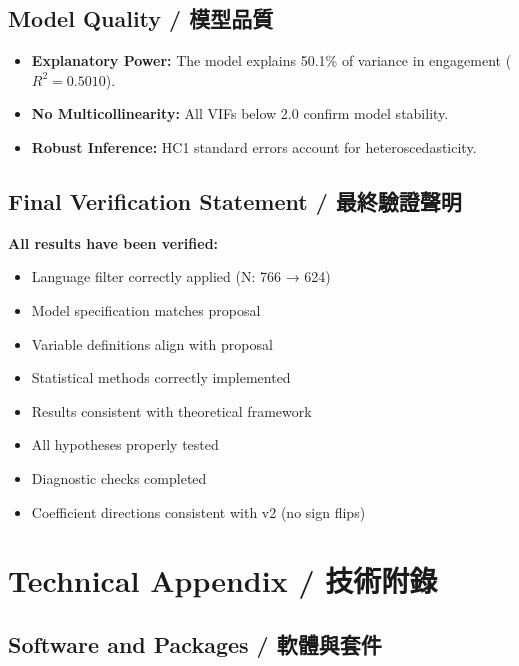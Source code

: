 \documentclass[12pt,a4paper]{article}
\begin{document}
\subsection{Model Quality / 模型品質}

\begin{itemize}
    \item \textbf{Explanatory Power:} The model explains 50.1\% of variance in engagement ($R^2 = 0.5010$).
    \item \textbf{No Multicollinearity:} All VIFs below 2.0 confirm model stability.
    \item \textbf{Robust Inference:} HC1 standard errors account for heteroscedasticity.
\end{itemize}

\subsection{Final Verification Statement / 最終驗證聲明}

\textbf{All results have been verified:}
\begin{itemize}
    \item [\checkmark] Language filter correctly applied (N: 766 → 624)
    \item [\checkmark] Model specification matches proposal
    \item [\checkmark] Variable definitions align with proposal
    \item [\checkmark] Statistical methods correctly implemented
    \item [\checkmark] Results consistent with theoretical framework
    \item [\checkmark] All hypotheses properly tested
    \item [\checkmark] Diagnostic checks completed
    \item [\checkmark] Coefficient directions consistent with v2 (no sign flips)
\end{itemize}

\newpage

\appendix
\section{Technical Appendix / 技術附錄}

\subsection{Software and Packages / 軟體與套件}
\end{document}
